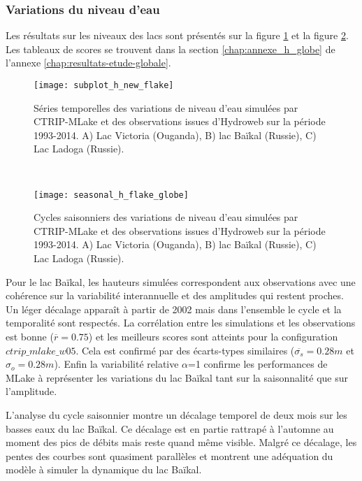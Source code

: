 \subsubsection*{{\selectfont Variations du niveau d'eau}}

Les résultats sur les niveaux des lacs sont présentés sur la figure \ref{h_globe_obs} et la figure \ref{h_globe_seasonal}. Les tableaux de scores se trouvent dans la section \ref{chap:annexe_h_globe} de l'annexe \ref{chap:resultats-etude-globale}. \\

\begin{figure}[h!]
\texttt{[image: subplot\_h\_new\_flake]}
\caption{Séries temporelles des variations de niveau d'eau simulées par CTRIP-MLake et des observations issues d'Hydroweb sur la période 1993-2014. A) Lac Victoria (Ouganda), B) lac Baïkal (Russie), C) Lac Ladoga (Russie).}
\label{h_globe_obs}
\end{figure}

~\\

\begin{figure}[h!]
\texttt{[image: seasonal\_h\_flake\_globe]}
\caption{Cycles saisonniers des variations de niveau d'eau simulées par CTRIP-MLake et des observations issues d'Hydroweb sur la période 1993-2014. A) Lac Victoria (Ouganda), B) lac Baïkal (Russie), C) Lac Ladoga (Russie).}
\label{h_globe_seasonal}
\end{figure}

\clearpage

Pour le lac Baïkal, les hauteurs simulées correspondent aux observations avec une cohérence sur la variabilité interannuelle et des amplitudes qui restent proches. Un léger décalage apparaît à partir de 2002 mais dans l'ensemble le cycle et la temporalité sont respectés. La corrélation entre les simulations et les observations est bonne ($\overline{r}=0.75$) et les meilleurs scores sont atteints pour la configuration $ctrip\_mlake\_w05$. Cela est confirmé par des écarts-types similaires ($\overline{\sigma_{s}}=0.28m$ et $\sigma_{o}=0.28m$). Enfin la variabilité relative $\alpha$=1 confirme les performances de MLake à représenter les variations du lac Baïkal tant sur la saisonnalité que sur l'amplitude.

L'analyse du cycle saisonnier montre un décalage temporel de deux mois sur les basses eaux du lac Baïkal. Ce décalage est en partie rattrapé à l'automne au moment des pics de débits mais reste quand même visible. Malgré ce décalage, les pentes des courbes sont quasiment parallèles et montrent une adéquation du modèle à simuler la dynamique du lac Baïkal.\\

